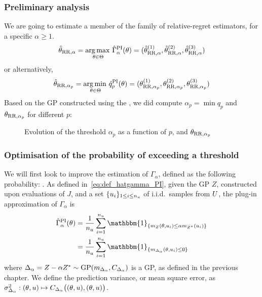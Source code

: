 \documentclass[../../Main_ManuscritThese.tex]{subfiles}
\newcommand\imgpath{/home/victor/acadwriting/Manuscrit/Text/Chapter5/img/}
\begin{document}
\subsubsection{Preliminary analysis}
We are going to estimate a member of the family of relative-regret
estimators, for a specific $\alpha\geq 1$.
\begin{equation}
  \hat{\theta}_{\mathrm{RR},\alpha} = \operatorname*{arg\,max \,}_{\theta\in\Theta} \hat{\Gamma}^{\mathrm{PI}}_{\alpha}(\theta) = (\hat{\theta}^{(1)}_{\mathrm{RR},\alpha}, \hat{\theta}^{(2)}_{\mathrm{RR},\alpha},\hat{\theta}^{(3)}_{\mathrm{RR},\alpha})
\end{equation}
or alternatively,
\begin{equation}
  \hat{\theta}_{\mathrm{RR},\alpha_p} = \operatorname*{arg\,min \,}_{\theta \in \Theta} \hat{q}^{\mathrm{PI}}_p(\theta) = (\theta^{(1)}_{\mathrm{RR},\alpha_p}, \theta^{(2)}_{\mathrm{RR},\alpha_p},\theta^{(3)}_{\mathrm{RR},\alpha_p})
\end{equation}
Based on the GP constructed using the , we did compute
$\alpha_p = \min q_p$ and $\theta_{\mathrm{RR},\alpha_p}$ for different
$p$:

\begin{figure}[ht]
  \centering
  
  \caption{\label{fig:evo_alphap_kp} Evolution of the threshold $\alpha_p$ as a function of $p$, and $\theta_{\mathrm{RR},\alpha_p}$}
\end{figure}

\subsubsection{Optimisation of the probability of exceeding a threshold}
We will first look to improve the estimation of $\Gamma_{\alpha}$,
defined as the following probability:
. As defined
in~\cref{eq:def_hatgamma_PI}, given the GP $Z$, constructed upon
evaluations of $J$, and a set $\{u_i\}_{1\leq i\leq n_{u}}$ of
i.i.d.\ samples from $U$, the plug-in approximation of
$\Gamma_{\alpha}$ is
\begin{align}
  \hat{\Gamma}^{\mathrm{PI}}_{\alpha}(\kk) &= \frac{1}{n_\uu}\sum_{i=1}^{n_{\uu}} \mathbbm{1}_{\{m_Z(\kk, \uu_i) \leq \alpha m_{Z^*}(\uu_i)\}} \\
                                           &= \frac{1}{n_\uu}\sum_{i=1}^{n_{\uu}} \mathbbm{1}_{\{m_{\Delta_{\alpha}}(\kk,\uu_i) \leq 0\}}
\end{align}
where
$\Delta_{\alpha} = Z - \alpha Z^* \sim \operatorname{\mathrm{GP}}(m_{\Delta_{\alpha}},
C_{\Delta_\alpha})$ is a GP, as defined in the previous chapter. We
define the prediction variance, or mean square error, as
$\sigma^2_{\Delta_{\alpha}}: (\theta, u) \mapsto
C_{\Delta_{\alpha}}\big((\theta, u), (\theta, u) \big)$.
\end{document}
